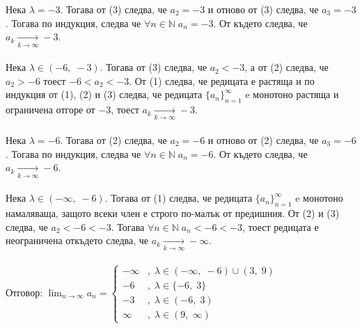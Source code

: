 \documentclass[12pt]{article}
\newcommand{\N}{\mathbb{N}}
\begin{document}
Нека $\lambda = -3$. Тогава от (3) следва, че $a_2 = -3$ и отново от (3) следва, че $a_3 = -3$. Тогава по индукция, следва че $\forall n \in \N \; a_n = -3$. От където следва, че $a_k \underset{k \to \infty}{\to} -3$. \\\\

Нека $\lambda \in (-6, \; -3)$. Тогава от (3) следва, че $a_2 < -3$, а от (2) следва, че $a_2 > -6$ тоест $-6 < a_2 < -3$. От (1) следва, че редицата е растяща и по индукция от (1), (2) и (3) следва, че
редицата $\{a_n\}_{n = 1}^\infty$ e монотоно растяща и ограничена отгоре от $-3$, тоест $ a_k \underset{k \to \infty}{\to} -3$. \\\\

Нека $\lambda = -6$. Тогава от (2) следва, че $a_2 = -6$ и отново от (2) следва, че $a_3 = -6$. Тогава по индукция, следва че $\forall n \in \N \; a_n = -6$. От където следва, че $a_k \underset{k \to \infty}{\to} -6$. \\\\

Нека $\lambda \in (-\infty, \; -6)$. Тогава от (1) следва, че редицата $\{a_n\}_{n = 1}^\infty$ e монотоно намаляваща, защото всеки член е строго по-малък от предишния.
От (2) и (3) следва, че $a_2 < -6 < -3$. Тогава $\forall n \in \N \; a_n < -6 < -3$, тоест редицата е неограничена откъдето следва, че $a_k \underset{k \to \infty}{\to} -\infty$. \\\\

Отговор: $\lim_{n \to \infty} a_n = \begin{cases}
    -\infty &, \; \lambda \in (-\infty, \; -6) \cup (3, \; 9) \\
    -6 &, \; \lambda \in \{-6, \; 3\} \\
    -3 &, \; \lambda \in (-6, \; 3) \\
    \infty &, \; \lambda \in (9, \; \infty)
\end{cases}$
\end{document}
